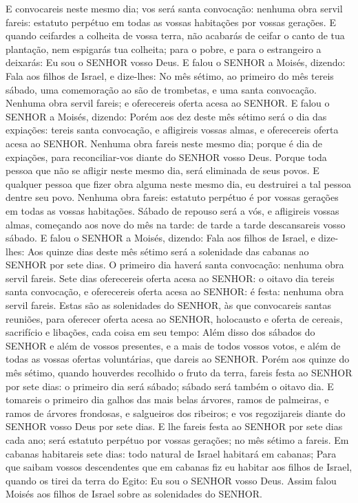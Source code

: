 {E convocareis neste mesmo dia; vos será santa convocação: nenhuma obra servil fareis: estatuto perpétuo em todas as vossas habitações por vossas gerações.
E quando ceifardes a colheita de vossa terra, não acabarás de ceifar o canto de tua plantação, nem espigarás tua colheita; para o pobre, e para o estrangeiro a deixarás: Eu sou o SENHOR vosso Deus.
E falou o SENHOR a Moisés, dizendo:
Fala aos filhos de Israel, e dize-lhes: No mês sétimo, ao primeiro do mês tereis sábado, uma comemoração ao são de trombetas, e uma santa convocação.
Nenhuma obra servil fareis; e oferecereis oferta acesa ao SENHOR.
E falou o SENHOR a Moisés, dizendo:
Porém aos dez deste mês sétimo será o dia das expiações: tereis santa convocação, e afligireis vossas almas, e oferecereis oferta acesa ao SENHOR.
Nenhuma obra fareis neste mesmo dia; porque é dia de expiações, para reconciliar-vos diante do SENHOR vosso Deus.
Porque toda pessoa que não se afligir neste mesmo dia, será eliminada de seus povos.
E qualquer pessoa que fizer obra alguma neste mesmo dia, eu destruirei a tal pessoa dentre seu povo.
Nenhuma obra fareis: estatuto perpétuo é por vossas gerações em todas as vossas habitações.
Sábado de repouso será a vós, e afligireis vossas almas, começando aos nove do mês na tarde: de tarde a tarde descansareis vosso sábado.
E falou o SENHOR a Moisés, dizendo:
Fala aos filhos de Israel, e dize-lhes: Aos quinze dias deste mês sétimo será a solenidade das cabanas ao SENHOR por sete dias.
O primeiro dia haverá santa convocação: nenhuma obra servil fareis.
Sete dias oferecereis oferta acesa ao SENHOR: o oitavo dia tereis santa convocação, e oferecereis oferta acesa ao SENHOR: é festa: nenhuma obra servil fareis.
Estas são as solenidades do SENHOR, às que convocareis santas reuniões, para oferecer oferta acesa ao SENHOR, holocausto e oferta de cereais, sacrifício e libações, cada coisa em seu tempo:
Além disso dos sábados do SENHOR e além de vossos presentes, e a mais de todos vossos votos, e além de todas as vossas ofertas voluntárias, que dareis ao SENHOR.
Porém aos quinze do mês sétimo, quando houverdes recolhido o fruto da terra, fareis festa ao SENHOR por sete dias: o primeiro dia será sábado; sábado será também o oitavo dia.
E tomareis o primeiro dia galhos das mais belas árvores, ramos de palmeiras, e ramos de árvores frondosas, e salgueiros dos ribeiros; e vos regozijareis diante do SENHOR vosso Deus por sete dias.
E lhe fareis festa ao SENHOR por sete dias cada ano; será estatuto perpétuo por vossas gerações; no mês sétimo a fareis.
Em cabanas habitareis sete dias: todo natural de Israel habitará em cabanas;
Para que saibam vossos descendentes que em cabanas fiz eu habitar aos filhos de Israel, quando os tirei da terra do Egito: Eu sou o SENHOR vosso Deus.
Assim falou Moisés aos filhos de Israel sobre as solenidades do SENHOR.

}
